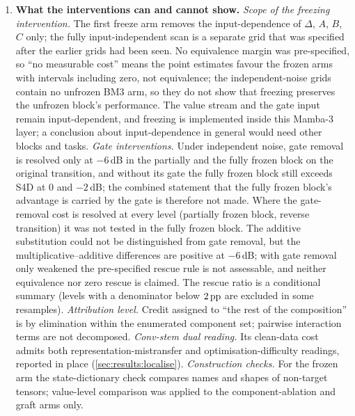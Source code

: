 \begin{enumerate}
\item \textbf{What the interventions can and cannot show.} \emph{Scope of the freezing intervention.} The first freeze arm removes the input-dependence of $\Delta$, $A$, $B$, $C$ only; the fully input-independent scan is a separate grid that was specified after the earlier grids had been seen. No equivalence margin was pre-specified, so ``no measurable cost'' means the point estimates favour the frozen arms with intervals including zero, not equivalence; the independent-noise grids contain no unfrozen BM3 arm, so they do not show that freezing preserves the unfrozen block's performance. The value stream and the gate input remain input-dependent, and freezing is implemented inside this Mamba-3 layer; a conclusion about input-dependence in general would need other blocks and tasks. \emph{Gate interventions.} Under independent noise, gate removal is resolved only at $-6$\,dB in the partially and the fully frozen block on the original transition, and without its gate the fully frozen block still exceeds S4D at $0$ and $-2$\,dB; the combined statement that the fully frozen block's advantage is carried by the gate is therefore not made. Where the gate-removal cost is resolved at every level (partially frozen block, reverse transition) it was not tested in the fully frozen block. The additive substitution could not be distinguished from gate removal, but the multiplicative--additive differences are positive at $-6$\,dB; with gate removal only weakened the pre-specified rescue rule is not assessable, and neither equivalence nor zero rescue is claimed. The rescue ratio is a conditional summary (levels with a denominator below $2\,\mathrm{pp}$ are excluded in some resamples). \emph{Attribution level.} Credit assigned to ``the rest of the composition'' is by elimination within the enumerated component set; pairwise interaction terms are not decomposed. \emph{Conv-stem dual reading.} Its clean-data cost admits both representation-mistransfer and optimisation-difficulty readings, reported in place (\ref{sec:results:localise}). \emph{Construction checks.} For the frozen arm the state-dictionary check compares names and shapes of non-target tensors; value-level comparison was applied to the component-ablation and graft arms only.

\end{enumerate}
